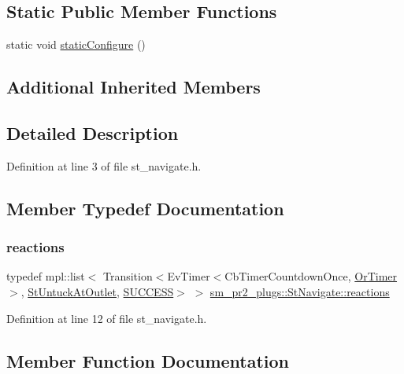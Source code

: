 \subsection*{Static Public Member Functions}
\begin{DoxyCompactItemize}
\item 
static void \hyperlink{structsm__pr2__plugs_1_1StNavigate_a052e5c763e3e8d487f3dcaa2a9a2fab0}{static\+Configure} ()
\end{DoxyCompactItemize}
\subsection*{Additional Inherited Members}


\subsection{Detailed Description}


Definition at line 3 of file st\+\_\+navigate.\+h.



\subsection{Member Typedef Documentation}
\mbox{\label{structsm__pr2__plugs_1_1StNavigate_a11299afba109067d019e8526f10f2286}} 
\subsubsection{\texorpdfstring{reactions}{reactions}}
{\footnotesize\ttfamily typedef mpl\+::list$<$ Transition$<$Ev\+Timer$<$Cb\+Timer\+Countdown\+Once, \hyperlink{classsm__pr2__plugs_1_1OrTimer}{Or\+Timer}$>$, \hyperlink{structsm__pr2__plugs_1_1StUntuckAtOutlet}{St\+Untuck\+At\+Outlet}, \hyperlink{classSUCCESS}{S\+U\+C\+C\+E\+SS}$>$ $>$ \hyperlink{structsm__pr2__plugs_1_1StNavigate_a11299afba109067d019e8526f10f2286}{sm\+\_\+pr2\+\_\+plugs\+::\+St\+Navigate\+::reactions}}



Definition at line 12 of file st\+\_\+navigate.\+h.



\subsection{Member Function Documentation}
\mbox{\label{structsm__pr2__plugs_1_1StNavigate_a0e58e927f01a817040c13987ecd4695f}} 
